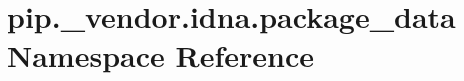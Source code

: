 \hypertarget{namespacepip_1_1__vendor_1_1idna_1_1package__data}{}\section{pip.\+\_\+vendor.\+idna.\+package\+\_\+data Namespace Reference}
\label{namespacepip_1_1__vendor_1_1idna_1_1package__data}
